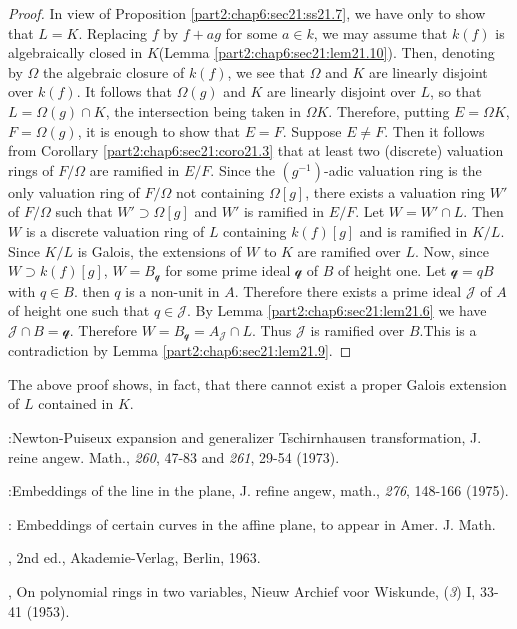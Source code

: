 \begin{proof}
  In view of Proposition \ref{part2:chap6:sec21:ss21.7}, we have only
  to show that $L = K$. Replacing $f$ by $f + ag$ for some $a \in k$,
  we may assume that $k(f)$ is algebraically closed in
  $K$(Lemma \ref{part2:chap6:sec21:lem21.10}). Then, denoting by
  $\Omega$  the algebraic closure of $k(f)$, we see that $\Omega$ 
and $K$ are linearly disjoint over $k(f)$. It follows that
  $\Omega (g)$ and $K$ are linearly disjoint over $L$, so that $L =
  \Omega (g) \cap K$, the intersection being taken in $\Omega
  K$. Therefore, putting $E= \Omega K$, $F = \Omega (g)$, it is enough
  to show that $E= F$. Suppose $E \neq F$. Then it follows from
  Corollary \ref{part2:chap6:sec21:coro21.3} that at least two
  (discrete) valuation rings of $F / \Omega$ are ramified in
  $E/F$. Since the $(g^{-1})$-adic valuation ring is the only
  valuation ring of $F / \Omega$ not containing $\Omega [g]$, there
  exists a valuation ring $W'$ of $F/ \Omega$ such that $W' \supset
  \Omega[g]$ and $W'$ is ramified in $E/F$. Let $W= W'\cap L$. Then $W$ is a
  discrete valuation ring of $L$ containing $k(f)[g]$ and is ramified
  in $K/L$. Since $K/L$ is Galois, the extensions of $W$ to $K$ are
  ramified over $L$. Now, since $W \supset k(f)[g]$, $W= B_\mathscr{q}$ for some prime ideal $\mathscr{q}$ of $B$ of height
  one. Let $\mathscr{q}= qB$ with $q \in B$. then $q$ is a non-unit in
  $A$. Therefore there exists a prime ideal $\mathscr{J}$ of $A$ of height one such that $q \in \mathscr{J}$. By Lemma \ref{part2:chap6:sec21:lem21.6} we have $\mathscr{J} \cap B = \mathscr{q}$. Therefore $W = B_{\mathscr{q}} = A_{\mathscr{J}} \cap L$. Thus $\mathscr{J}$ is ramified over $B$.\pageoriginale This is a contradiction by Lemma \ref{part2:chap6:sec21:lem21.9}.
\end{proof}


\begin{remark}\label{part2:chap6:sec21:rem21.12}
  The above proof shows, in fact, that there cannot exist a proper
  Galois extension of $L$ contained in $K$.
\end{remark}


\begin{thebibliography}{99}
:\pageoriginale Newton-Puiseux expansion and
  generalizer Tschirnhausen transformation, J. reine angew. Math.,
  {\em 260}, 47-83 and {\em 261}, 29-54 (1973).

:Embeddings of the line in the
  plane, J. refine angew, math., {\em 276}, 148-166 (1975).

: Embeddings of certain curves
  in the affine plane, to appear in Amer. J. Math.

, 2nd ed., Akademie-Verlag,
  Berlin, 1963.

, On polynomial rings in two variables,
  Nieuw Archief voor Wiskunde, ({\em 3}) I, 33-41 (1953).
\end{thebibliography}
